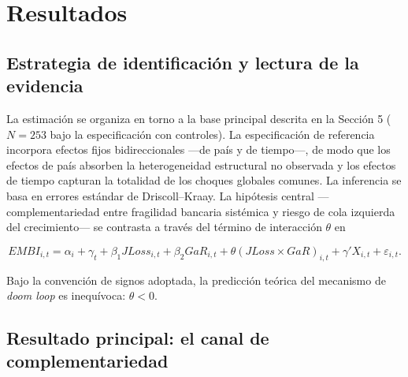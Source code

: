 \documentclass[5p,times,twocolumn,authoryear]{elsarticle}
\begin{document}

\section{Resultados}

\subsection{Estrategia de identificación y lectura de la evidencia}

La estimación se organiza en torno a la base principal descrita en la Sección 5 ($N=253$ bajo la especificación con controles). La especificación de referencia incorpora efectos fijos bidireccionales —de país y de tiempo—, de modo que los efectos de país absorben la heterogeneidad estructural no observada y los efectos de tiempo capturan la totalidad de los choques globales comunes. La inferencia se basa en errores estándar de Driscoll–Kraay. La hipótesis central —complementariedad entre fragilidad bancaria sistémica y riesgo de cola izquierda del crecimiento— se contrasta a través del término de interacción $\theta$ en

\[EMBI_{i,t}=\alpha_i+\gamma_t+\beta_1 JLoss_{i,t}+\beta_2 GaR_{i,t}+\theta (JLoss\times GaR)_{i,t}+\gamma' X_{i,t}+\varepsilon_{i,t}.\]

Bajo la convención de signos adoptada, la predicción teórica del mecanismo de \textit{doom loop} es inequívoca: $\theta<0$.

\subsection{Resultado principal: el canal de complementariedad}
\end{document}
